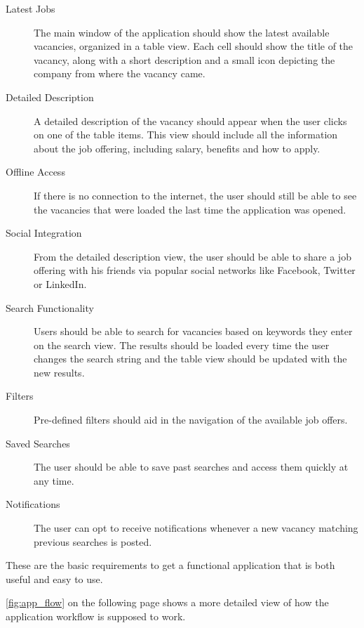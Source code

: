\begin{description}
\item[Latest Jobs] The main window of the application should show the latest available vacancies, organized in a table view. Each cell should show the title of the vacancy, along with a short description and a small icon depicting the company from where the vacancy came.
\item[Detailed Description] A detailed description of the vacancy should appear when the user clicks on one of the table items. This view should include all the information about the job offering, including salary, benefits and how to apply.
\item[Offline Access] If there is no connection to the internet, the user should still be able to see the vacancies that were loaded the last time the application was opened.
\item[Social Integration] From the detailed description view, the user should be able to share a job offering with his friends via popular social networks like Facebook, Twitter or LinkedIn. 
\item[Search Functionality] Users should be able to search for vacancies based on keywords they enter on the search view. The results should be loaded every time the user changes the search string and the table view should be updated with the new results.
\item[Filters] Pre-defined filters should aid in the navigation of the available job offers.
\item[Saved Searches] The user should be able to save past searches and access them quickly at any time.   
\item[Notifications] The user can opt to receive notifications whenever a new vacancy matching previous searches is posted.
\end{description}

These are the basic requirements to get a functional application that is both useful and easy to use.

\autoref{fig:app_flow} on the following page shows a more detailed view of how the application workflow is supposed to work.

